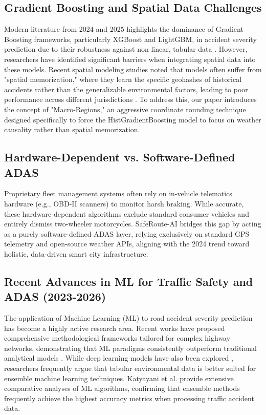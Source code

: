\documentclass[conference]{IEEEtran}
\begin{document}
\subsection{Gradient Boosting and Spatial Data Challenges}
Modern literature from 2024 and 2025 highlights the dominance of Gradient Boosting frameworks, particularly XGBoost and LightGBM, in accident severity prediction due to their robustness against non-linear, tabular data \cite{ref9}\cite{li2025driver}. However, researchers have identified significant barriers when integrating spatial data into these models. Recent spatial modeling studies \cite{ref7} noted that models often suffer from "spatial memorization," where they learn the specific geohashes of historical accidents rather than the generalizable environmental factors, leading to poor performance across different jurisdictions \cite{ref7}. To address this, our paper introduces the concept of "Macro-Regions," an aggressive coordinate rounding technique designed specifically to force the HistGradientBoosting model to focus on weather causality rather than spatial memorization.

\subsection{Hardware-Dependent vs. Software-Defined ADAS}
Proprietary fleet management systems often rely on in-vehicle telematics hardware (e.g., OBD-II scanners) to monitor harsh braking. While accurate, these hardware-dependent algorithms exclude standard consumer vehicles and entirely dismiss two-wheeler motorcycles. SafeRoute-AI bridges this gap by acting as a purely software-defined ADAS layer, relying exclusively on standard GPS telemetry and open-source weather APIs, aligning with the 2024 trend toward holistic, data-driven smart city infrastructure.



\subsection{Recent Advances in ML for Traffic Safety and ADAS (2023-2026)}
The application of Machine Learning (ML) to road accident severity prediction has become a highly active research area. Recent works have proposed comprehensive methodological frameworks tailored for complex highway networks, demonstrating that ML paradigms consistently outperform traditional analytical models \cite{ref1, ref5}. While deep learning models have also been explored \cite{ref2}, researchers frequently argue that tabular environmental data is better suited for ensemble machine learning techniques. Katyayani et al. \cite{ref4} provide extensive comparative analyses of ML algorithms, confirming that ensemble methods frequently achieve the highest accuracy metrics when processing traffic accident data. 
\end{document}
